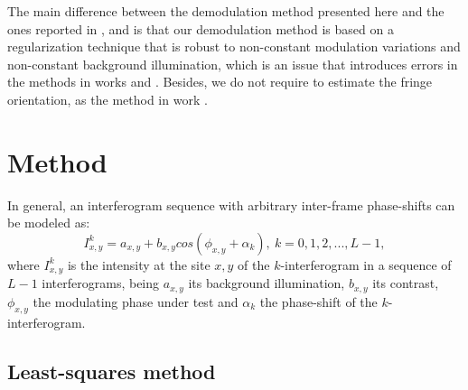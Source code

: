 \documentclass[letterpaper,12pt]{article}   %
\begin{document}
The main difference between the demodulation method presented here and the ones reported 
in  \cite{a14},\cite{a15} and \cite{a17} is that our demodulation method is based on a 
regularization technique that is robust to non-constant modulation variations and 
non-constant background illumination, which is an issue that introduces errors in the 
methods in works \cite{a14} and \cite{a15}. Besides, we do not require to estimate the 
fringe orientation, as the method in work \cite{a17}.

\section{Method}

In general, an interferogram sequence with arbitrary inter-frame phase-shifts can be
modeled as:
\begin{equation}\label{I_k1}
	I_{x,y}^k=a_{x,y}+b_{x,y}cos(\phi_{x,y}+\alpha_k),\: k=0,1,2,...,L-1,
\end{equation}
where $I_{x,y}^k$ is the intensity at the site $x,y$ of the $k$-interferogram in a 
sequence of $L-1$ interferograms, being $a_{x,y}$ its background illumination, $b_{x,y}$
its contrast, $\phi_{x,y}$ the modulating phase under test and $\alpha_k$ the phase-shift
of the $k$-interferogram.

\subsection{Least-squares method}
\end{document}

